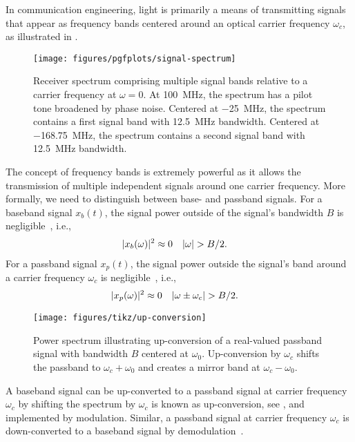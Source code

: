 In communication engineering, light is primarily a means of transmitting signals that appear as frequency bands centered around an optical carrier frequency $\omega_c$, as illustrated in .
\begin{figure}[ht]
	\centering
	\texttt{[image: figures/pgfplots/signal-spectrum]}
	\caption{Receiver spectrum comprising multiple signal bands relative to a carrier frequency at $\omega=0$. At \SI{+100}{\mega\hertz}, the spectrum has a pilot tone broadened by phase noise. Centered at \SI{-25}{\mega\hertz}, the spectrum contains a first signal band with \SI{12.5}{\mega\hertz} bandwidth. Centered at \SI{-168.75}{\mega\hertz}, the spectrum contains a second signal band with \SI{12.5}{\mega\hertz} bandwidth.}\label{fig:signal_spectrum}
\end{figure}
The concept of frequency bands is extremely powerful as it allows the transmission of multiple independent signals around one carrier frequency.
More formally, we need to distinguish between base- and passband signals.
For a baseband signal $x_b(t)$, the signal power outside of the signal's bandwidth $B$ is negligible~\cite[p.~15]{Madhow2008}, i.e.,
\begin{align}
	\lvert x_b(\omega)\rvert^2
	&\approx
	0
	&
	\lvert\omega\rvert
	&>
	B/2
	.
\end{align}
For a passband signal $x_p(t)$, the signal power outside the signal's band around a carrier frequency $\omega_c$ is negligible~\cite[p.~16]{Madhow2008}, i.e.,
\begin{align}
	\lvert x_p(\omega)\rvert^2
	&\approx
	0
	&
	\lvert\omega\pm\omega_c\rvert
	&>
	B/2
	.	
\end{align}
\begin{figure}[ht]
	\centering
	\texttt{[image: figures/tikz/up-conversion]}
	\caption{Power spectrum illustrating up-conversion of a real-valued passband signal with bandwidth $B$ centered at $\omega_0$. Up-conversion by $\omega_c$ shifts the passband to $\omega_c+\omega_0$ and creates a mirror band at $\omega_c-\omega_0$.}\label{fig:up_conversion}
\end{figure}
A baseband signal can be up-converted to a passband signal at carrier frequency $\omega_c$ by shifting the spectrum by $\omega_c$ is known as up-conversion, see , and implemented by modulation.
Similar, a passband signal at carrier frequency $\omega_c$ is down-converted to a baseband signal by demodulation~\cite[p.~26]{Madhow2008}.


